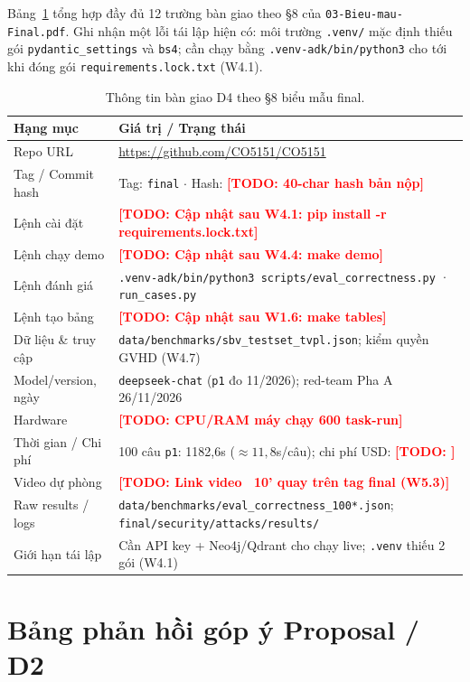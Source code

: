 \documentclass[sigconf,nonacm]{acmart}
\newcommand{\TODO}[1]{\textcolor{red}{\textbf{[TODO: #1]}}}
\begin{document}
Bảng~\ref{tab:d4} tổng hợp đầy đủ 12 trường bàn giao theo §8 của \texttt{03-Bieu-mau-Final.pdf}. Ghi nhận một lỗi tái lập hiện có: môi trường \texttt{.venv/} mặc định thiếu gói \texttt{pydantic\_settings} và \texttt{bs4}; cần chạy bằng \texttt{.venv-adk/bin/python3} cho tới khi đóng gói \texttt{requirements.lock.txt} (W4.1).

\begin{table}[H]
\caption{Thông tin bàn giao D4 theo §8 biểu mẫu final.}
\label{tab:d4}
\scriptsize
\begin{tabular}{@{}p{2.3cm}p{5.6cm}@{}}
\toprule
\textbf{Hạng mục} & \textbf{Giá trị / Trạng thái} \\
\midrule
Repo URL & \url{https://github.com/CO5151/CO5151} \\
Tag / Commit hash & Tag: \texttt{final} $\cdot$ Hash: \TODO{40-char hash bản nộp} \\
Lệnh cài đặt & \TODO{Cập nhật sau W4.1: pip install -r requirements.lock.txt} \\
Lệnh chạy demo & \TODO{Cập nhật sau W4.4: make demo} \\
Lệnh đánh giá & \texttt{.venv-adk/bin/python3 scripts/eval\_correctness.py} · \texttt{run\_cases.py} \\
Lệnh tạo bảng & \TODO{Cập nhật sau W1.6: make tables} \\
Dữ liệu \& truy cập & \texttt{data/benchmarks/sbv\_testset\_tvpl.json}; kiểm quyền GVHD (W4.7) \\
Model/version, ngày & \texttt{deepseek-chat} (\texttt{p1} đo 11/2026); red-team Pha A 26/11/2026 \\
Hardware & \TODO{CPU/RAM máy chạy 600 task-run} \\
Thời gian / Chi phí & 100 câu \texttt{p1}: 1182,6s ($\approx 11,8$s/câu); chi phí USD: \TODO{} \\
Video dự phòng & \TODO{Link video ~10' quay trên tag final (W5.3)} \\
Raw results / logs & \texttt{data/benchmarks/eval\_correctness\_100*.json}; \texttt{final/security/attacks/results/} \\
Giới hạn tái lập & Cần API key + Neo4j/Qdrant cho chạy live; \texttt{.venv} thiếu 2 gói (W4.1) \\
\bottomrule
\end{tabular}
\end{table}

\section{Bảng phản hồi góp ý Proposal / D2}
\label{app:response}
\end{document}
